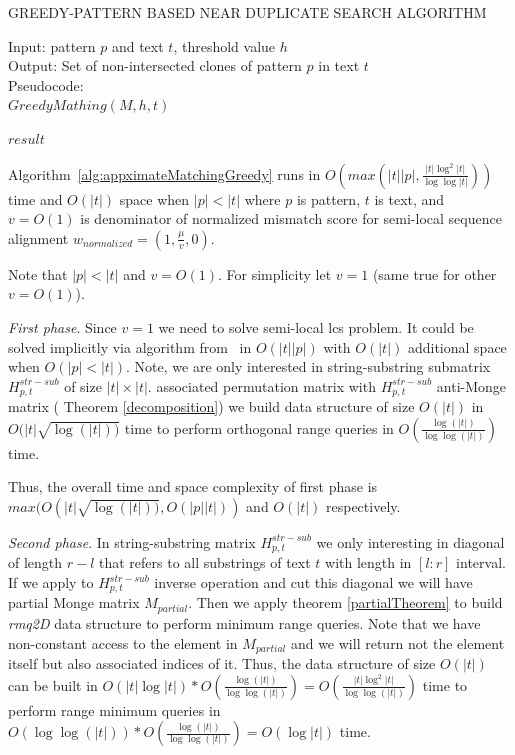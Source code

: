 \begin{algorithm}[H]
\caption{GREEDY-PATTERN BASED NEAR DUPLICATE
SEARCH ALGORITHM}
\label{alg:appximateMatchingGreedy}
Input: pattern $p$ and text $t$, threshold value $h$\\
Output: Set of non-intersected clones of pattern $p$ in text $t$\\
Pseudocode:\\
$GreedyMathing(M,h,t)$
\begin{algorithmic}[1]

\RETURN $result$
\end{algorithmic}
\end{algorithm}


\begin{theorem}
Algorithm~\ref{alg:appximateMatchingGreedy} runs in $O(max(|t||p|,\frac{|t| \log^2 |t|}{\log \log |t|} ))$ time and $O(|t|)$ space when $|p|<|t|$ where $p$ is pattern, $t$ is text, and $v=O(1)$ is denominator of normalized mismatch score for semi-local sequence alignment $w_{normalized} = (1,\frac{\mu}{v},0)$.
\end{theorem}
Note that $|p|<|t|$ and $v=O(1)$.
For simplicity let $v=1$ (same true for other $v=O(1)$).

\emph{First phase}. 
Since $v=1$ we need to solve semi-local lcs problem.
It could be solved implicitly via algorithm from~\cite{.} in $O(|t||p|)$ with $O(|t|)$ additional space when $O(|p|<|t|)$.
Note, we are only interested in string-substring submatrix $H^{str-sub}_{p,t}$ of size $|t| \times |t|$.
 associated permutation matrix with $H^{str-sub}_{p,t}$ anti-Monge matrix ( Theorem \ref{decomposition}) we build data structure of size $O(|t|)$ in $O(|t|\sqrt{\log(|t|))}$ time to perform  orthogonal range queries in $O(\frac{\log (|t|)}{\log \log (|t|)})$ time.

Thus, the overall time and space complexity of first phase 
is $max(O(|t|  \sqrt{\log(|t|))},O(|p||t|))$ and
$O(|t|)$ respectively.

\emph{Second phase}.
In string-substring matrix $H^{str-sub}_{p,t}$ we only interesting in diagonal of length $r-l$ that refers to all substrings of text $t$ with length in $[l:r]$ interval. 
If we apply to  $H^{str-sub}_{p,t}$ inverse operation and cut this diagonal we will have partial Monge matrix $M_{partial}$.
Then we apply theorem  \ref{partialTheorem} to build 
\emph{rmq2D} data structure to perform minimum range queries.
Note that we have non-constant access to the element in $M_{partial}$ and we will return not the element itself but also associated indices of it.
Thus, the data structure of size 
$O(|t|)$
 can be built in $O(|t| \log |t|)* O(\frac{\log (|t|)}{\log \log (|t|)}) = O(\frac{|t|\log^2 |t|}{\log \log (|t|)}) $ time
to perform range minimum queries in $O(\log \log (|t|))*O(\frac{\log (|t|)}{\log \log (|t|)})=O(\log |t|)$ time.

